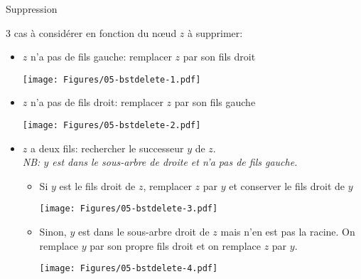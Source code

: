 \begin{frame}{Suppression}

3 cas à considérer en fonction du n\oe ud $z$ à supprimer:
\begin{itemize}
\item $z$ n'a pas de fils gauche: remplacer $z$ par son fils droit
\centerline{\texttt{[image: Figures/05-bstdelete-1.pdf]}}
\item $z$ n'a pas de fils droit: remplacer $z$ par son fils gauche
\centerline{\texttt{[image: Figures/05-bstdelete-2.pdf]}}
\end{itemize}


\end{frame}

\begin{frame}
\begin{itemize}
\item $z$ a deux fils: rechercher le successeur $y$ de $z$.\\\emph{NB: $y$ est dans le sous-arbre de droite et n'a pas de fils gauche.}
\begin{itemize}
\item Si $y$ est le fils droit de $z$, remplacer $z$ par $y$ et conserver le fils droit de $y$
\centerline{\texttt{[image: Figures/05-bstdelete-3.pdf]}}
\item Sinon, $y$ est dans le sous-arbre droit de $z$ mais n'en est pas la racine. On remplace $y$ par son propre fils droit et on remplace $z$ par $y$.
\centerline{\texttt{[image: Figures/05-bstdelete-4.pdf]}}
\end{itemize}
\end{itemize}
\end{frame}

